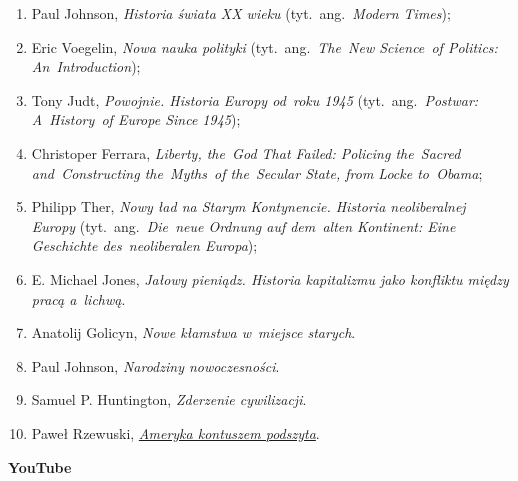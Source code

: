 \documentclass[a4paper,11pt]{article}
\newcommand{\spaceOne}{1.5em}
\newcommand{\tb}{\textbf}
\newcommand{\Center}[1]{\begin{center} #1 \end{center}}
\newcommand{\CenterTB}[1]{\Center{\tb{#1}}}
\begin{document}
\begin{enumerate}
\item Paul Johnson, \emph{Historia świata XX wieku}
  (tyt.~ang.~\emph{Modern Times});
\item Eric Voegelin, \emph{Nowa nauka polityki}
  (tyt.~ang.~\emph{The~New Science~of Politics: An~Introduction});
\item Tony Judt, \emph{Powojnie. Historia Europy od~roku 1945}
  (tyt.~ang.~\emph{Postwar: A~History~of Europe Since 1945});
\item Christoper Ferrara, \emph{Liberty, the~God That Failed: Policing
    the~Sacred and~Constructing the~Myths~of the~Secular State, from
    Locke to~Obama};
\item Philipp Ther, \emph{Nowy ład na Starym Kontynencie. Historia
    neoliberalnej Europy} (tyt.~ang.~\emph{Die~neue Ordnung auf
    dem~alten Kontinent: Eine Geschichte des~neoliberalen Europa});
\item E. Michael Jones, \emph{Jałowy pieniądz. Historia kapitalizmu
    jako konfliktu między pracą a~lichwą}.
\item Anatolij Golicyn, \emph{Nowe kłamstwa w~miejsce starych}.
\item Paul Johnson, \emph{Narodziny nowoczesności}.
\item Samuel P. Huntington, \emph{Zderzenie cywilizacji}.
\item Paweł Rzewuski,
  \href{http://www.teologiapolityczna.pl/pawel-rzewuski-ameryka-kontuszem-podszyta-tpct-14-/}{\emph{Ameryka
      kontuszem podszyta}}.
\end{enumerate}

\vspace{\spaceOne}



\CenterTB{YouTube}
\end{document}
